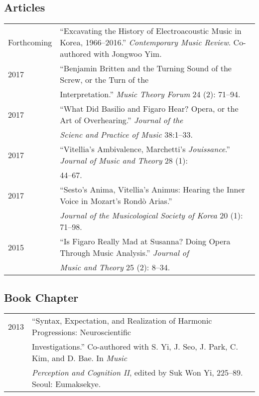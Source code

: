 \documentclass[letter,11pt]{article}
\begin{document}
  \subsection*{Articles}
  \hspace*{-0.25cm}
  \begin{tabular}{p{2.5cm} p{12.5cm}}
    Forthcoming & ``Excavating the History of Electroacoustic Music in Korea, 1966--2016.'' \textit{Contemporary Music Review}. Co-authored with Jongwoo Yim.\\[2mm]
    
    2017 & ``Benjamin Britten and the Turning Sound of the Screw, or the Turn of the\\ 
    & Interpretation.'' \textit{Music Theory Forum} 24 (2): 71--94.\\[2mm]
    
    2017 & ``What Did Basilio and Figaro Hear? Opera, or the Art of Overhearing.'' \textit{Journal of the}\\ 
    & \textit{Scienc and Practice of Music} 38:1--33.\\[2mm]
    
    2017 & ``Vitellia's Ambivalence, Marchetti's \textit{Jouissance}.'' \textit{Journal of Music and Theory} 28 (1):\\
    & 44--67.\\[2mm]
    
    2017 & ``Sesto's Anima, Vitellia's Animus: Hearing the Inner Voice in Mozart's Rond\`{o} Arias.''\\
    & \textit{Journal of the Musicological Society of Korea} 20 (1): 71--98.\\[2mm]
    
    2015 & ``Is Figaro Really Mad at Susanna? Doing Opera Through Music Analysis.'' \textit{Journal of}\\
    & \textit{Music and Theory} 25 (2): 8--34.
  \end{tabular}
    
  \subsection*{Book Chapter}
  \hspace*{-0.25cm}
  \begin{tabular}{p{2.5cm} p{12.5cm}}
    2013 & “Syntax, Expectation, and Realization of Harmonic Progressions: Neuroscientific\\
    & Investigations.” Co-authored with S. Yi, J. Seo, J. Park, C. Kim, and D. Bae. In \textit{Music} \\
    & \textit{Perception and Cognition II}, edited by Suk Won Yi, 225–89. Seoul: Eumaksekye.
  \end{tabular}
    
\end{document}
